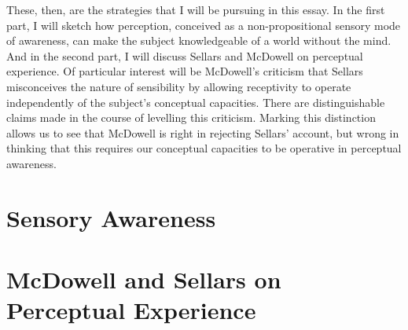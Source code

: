 \documentclass[12pt]{article}
\begin{document}
These, then, are the strategies that I will be pursuing in this essay. In the first part, I will sketch how perception, conceived as a non-propositional sensory mode of awareness, can make the subject knowledgeable of a world without the mind. And in the second part, I will discuss Sellars and McDowell on perceptual experience. Of particular interest will be McDowell's criticism that Sellars misconceives the nature of sensibility by allowing receptivity to operate independently of the subject's conceptual capacities. There are distinguishable claims made in the course of levelling this criticism. Marking this distinction allows us to see that McDowell is right in rejecting Sellars' account, but wrong in thinking that this requires our conceptual capacities to be operative in perceptual awareness. 

\section{Sensory Awareness} %
\label{sec:sensory_awareness}


\section{McDowell and Sellars on Perceptual Experience} %
\label{sec:mcdowell_on_sellars_on_perception}



 
 
\end{document}
